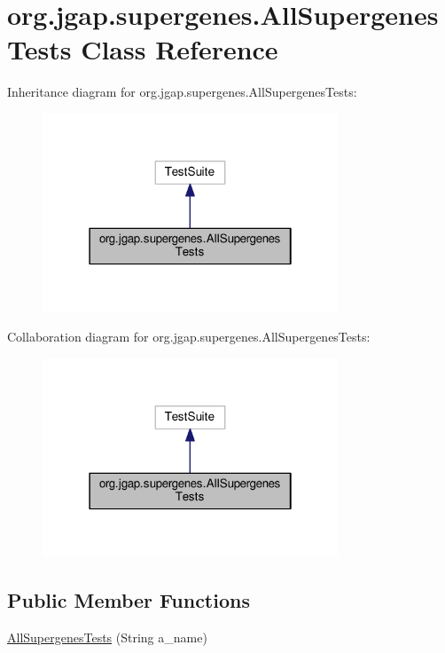 \hypertarget{classorg_1_1jgap_1_1supergenes_1_1_all_supergenes_tests}{\section{org.\-jgap.\-supergenes.\-All\-Supergenes\-Tests Class Reference}
\label{classorg_1_1jgap_1_1supergenes_1_1_all_supergenes_tests}
}


Inheritance diagram for org.\-jgap.\-supergenes.\-All\-Supergenes\-Tests\-:
\nopagebreak
\begin{figure}[H]
\begin{center}
\leavevmode
\includegraphics[width=250pt]{classorg_1_1jgap_1_1supergenes_1_1_all_supergenes_tests__inherit__graph}
\end{center}
\end{figure}


Collaboration diagram for org.\-jgap.\-supergenes.\-All\-Supergenes\-Tests\-:
\nopagebreak
\begin{figure}[H]
\begin{center}
\leavevmode
\includegraphics[width=250pt]{classorg_1_1jgap_1_1supergenes_1_1_all_supergenes_tests__coll__graph}
\end{center}
\end{figure}
\subsection*{Public Member Functions}
\begin{DoxyCompactItemize}
\item 
\hyperlink{classorg_1_1jgap_1_1supergenes_1_1_all_supergenes_tests_a15e29bd05f6efc5dc4b01349856077a2}{All\-Supergenes\-Tests} (String a\-\_\-name)
\end{DoxyCompactItemize}
